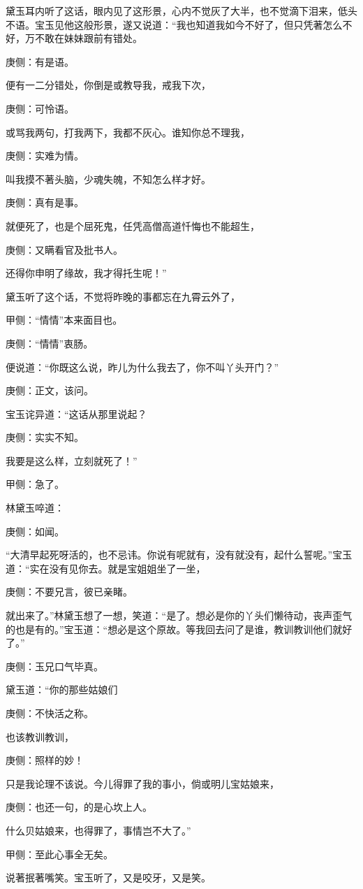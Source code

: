 \begin{parag}
    黛玉耳内听了这话，眼内见了这形景，心内不觉灰了大半，也不觉滴下泪来，低头不语。宝玉见他这般形景，遂又说道：“我也知道我如今不好了，但只凭著怎么不好，万不敢在妹妹跟前有错处。\begin{note}庚侧：有是语。\end{note}便有一二分错处，你倒是或教导我，戒我下次，\begin{note}庚侧：可怜语。\end{note}或骂我两句，打我两下，我都不灰心。谁知你总不理我，\begin{note}庚侧：实难为情。\end{note}叫我摸不著头脑，少魂失魄，不知怎么样才好。\begin{note}庚侧：真有是事。\end{note}就便死了，也是个屈死鬼，任凭高僧高道忏悔也不能超生，\begin{note}庚侧：又瞒看官及批书人。\end{note}还得你申明了缘故，我才得托生呢！”
\end{parag}


\begin{parag}
    黛玉听了这个话，不觉将昨晚的事都忘在九霄云外了，\begin{note}甲侧：“情情”本来面目也。\end{note}\begin{note}庚侧：“情情”衷肠。\end{note}便说道：“你既这么说，昨儿为什么我去了，你不叫丫头开门？”\begin{note}庚侧：正文，该问。\end{note}宝玉诧异道：“这话从那里说起？\begin{note}庚侧：实实不知。\end{note}我要是这么样，立刻就死了！”\begin{note}甲侧：急了。\end{note}林黛玉啐道：\begin{note}庚侧：如闻。\end{note}“大清早起死呀活的，也不忌讳。你说有呢就有，没有就没有，起什么誓呢。”宝玉道：“实在没有见你去。就是宝姐姐坐了一坐，\begin{note}庚侧：不要兄言，彼已亲睹。\end{note}就出来了。”林黛玉想了一想，笑道：“是了。想必是你的丫头们懒待动，丧声歪气的也是有的。”宝玉道：“想必是这个原故。等我回去问了是谁，教训教训他们就好了。”\begin{note}庚侧：玉兄口气毕真。\end{note}黛玉道：“你的那些姑娘们\begin{note}庚侧：不快活之称。\end{note}也该教训教训，\begin{note}庚侧：照样的妙！\end{note}只是我论理不该说。今儿得罪了我的事小，倘或明儿宝姑娘来，\begin{note}庚侧：也还一句，的是心坎上人。\end{note}什么贝姑娘来，也得罪了，事情岂不大了。”\begin{note}甲侧：至此心事全无矣。\end{note}说著抿著嘴笑。宝玉听了，又是咬牙，又是笑。
\end{parag}


